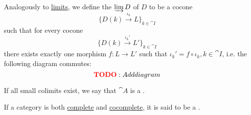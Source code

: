 \begin{definition}\label{def:categorical_colimit}\mcite\cite[def. 5.1.19(b)]{Leinster2016Basic}
  Analogously to \hyperref[def:categorical_limit]{limits}, we define the  \( \varinjlim D \) of \( D \) to be a cocone
  \begin{equation*}
    \{ D(k) \overset {\iota_k} \to L \}_{k \in \cat{I}}
  \end{equation*}
  such that for every cocone
  \begin{equation*}
    \{ D(k) \overset {\iota_k'} \to L' \}_{k \in \cat{I}}
  \end{equation*}
  there exists exactly one morphism \( f: L \to L' \) such that \( \iota_k' = f \circ \iota_k, k \in \cat{I} \), i.e. the following diagram commutes:
  \begin{equation*}
    \todo{Add diagram}\iffalse\begin{mplibcode}
      beginfig(1);
      input metapost/graphs;

      v1 := thelabel("$D(k)$", origin);
      v2 := thelabel("$L'$", (-1, -1) scaled u);
      v3 := thelabel("$L$", (1, -1) scaled u);

      a1 := straight_arc(v1, v2);
      a2 := straight_arc(v1, v3);

      d1 := straight_arc(v3, v2);

      draw_vertices(v);
      draw_arcs(a);

      drawarrow d1 dotted;

      label.ulft("$\iota_k'$", straight_arc_midpoint of a1);
      label.urt("$\iota_k$", straight_arc_midpoint of a2);
      label.top("$f$", straight_arc_midpoint of d1);
      endfig;
    \end{mplibcode}\fi
  \end{equation*}

  If all small colimits exist, we say that \( \cat{A} \) is a .
\end{definition}

\begin{definition}\label{def:cocomplete_category}
  If a category is both \hyperref[def:categorical_limit]{complete} and \hyperref[def:categorical_colimit]{cocomplete}, it is said to be a .
\end{definition}

